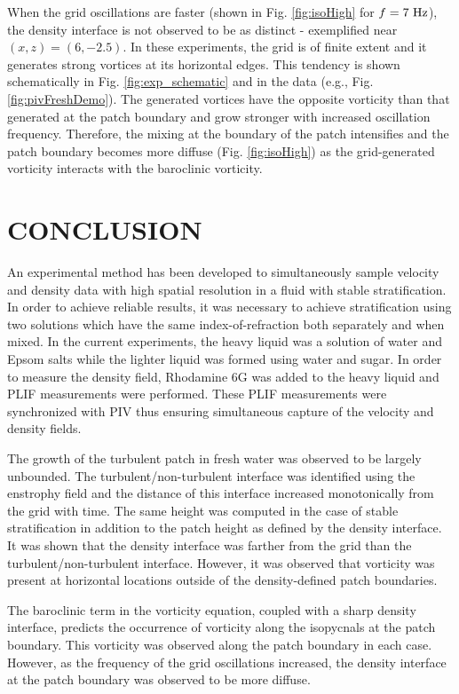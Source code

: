 \documentclass{piv13-abstract}
\newcommand{\unit}[1]{\ensuremath{\, \mathrm{\hspace{0.5mm}#1}}}
\newcommand{\figLabel}{Fig. }
\begin{document}
When the grid oscillations are faster (shown in \figLabel\ref{fig:isoHigh} for $f=7\unit{Hz}$), the density interface is not observed to be as distinct - exemplified near $(x,z)=(6,-2.5)$. In these experiments, the grid is of finite extent and it generates strong vortices at its horizontal edges. This tendency is shown schematically in \figLabel\ref{fig:exp_schematic} and in the data (e.g., \figLabel\ref{fig:pivFreshDemo}). The generated vortices have the opposite vorticity than that generated at the patch boundary and grow stronger with increased oscillation frequency. Therefore, the mixing at the boundary of the patch intensifies and the patch boundary becomes more diffuse (\figLabel\ref{fig:isoHigh}) as the grid-generated vorticity interacts with the baroclinic vorticity.

\FloatBarrier
\section{CONCLUSION}

An experimental method has been developed to simultaneously sample velocity and density data with high spatial resolution in a fluid with stable stratification. In order to achieve reliable results, it was necessary to achieve stratification using two solutions which have the same index-of-refraction both separately and when mixed. In the current experiments, the heavy liquid was a solution of water and Epsom salts while the lighter liquid was formed using water and sugar. In order to measure the density field, Rhodamine 6G was added to the heavy liquid and PLIF measurements were performed. These PLIF measurements were synchronized with PIV thus ensuring simultaneous capture of the velocity and density fields.

The growth of the turbulent patch in fresh water was observed to be largely unbounded. The turbulent/non-turbulent interface was identified using the enstrophy field and the distance of this interface increased monotonically from the grid with time. The same height was computed in the case of stable stratification in addition to the patch height as defined by the density interface. It was shown that the density interface was farther from the grid than the turbulent/non-turbulent interface. However, it was observed that vorticity was present at horizontal locations outside of the density-defined patch boundaries.

The baroclinic term in the vorticity equation, coupled with a sharp density interface, predicts the occurrence of vorticity along the isopycnals at the patch boundary. This vorticity was observed along the patch boundary in each case. However, as the frequency of the grid oscillations increased, the density interface at the patch boundary was observed to be more diffuse. 
\end{document}

